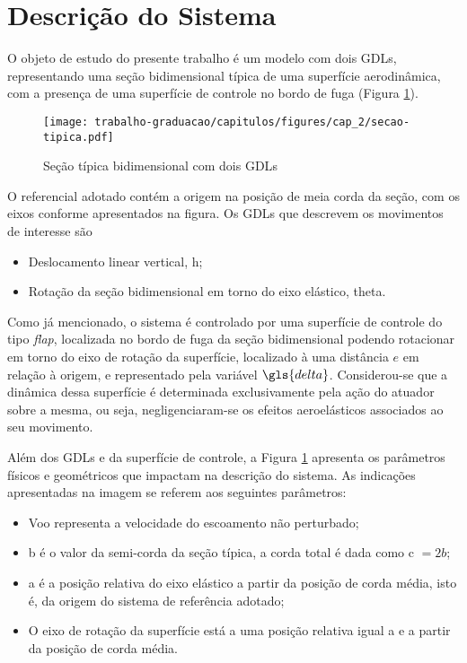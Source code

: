 
\section{Descrição do Sistema}\label{sec:descricao-sistema}

O objeto de estudo do presente trabalho é um modelo com dois \gls{GDL}s, representando uma seção bidimensional típica de uma superfície aerodinâmica, com a presença de uma superfície de controle no bordo de fuga (Figura \ref{fig:cap2:sistema-fisico}).

\begin{figure}[ht]
    \centering
    \caption{Seção típica bidimensional com dois \gls{GDL}s}
    \noindent\texttt{[image: trabalho-graduacao/capitulos/figures/cap\_2/secao-tipica.pdf]}
    \label{fig:cap2:sistema-fisico}
\end{figure}

O referencial adotado contém a origem na posição de meia corda da seção, com os eixos conforme apresentados na figura. Os \gls{GDL}s que descrevem os movimentos de interesse são

\begin{itemize}
    \item Deslocamento linear vertical, \gls{h};
    \item Rotação da seção bidimensional em torno do eixo elástico, \gls{theta}.
\end{itemize}

Como já mencionado, o sistema é controlado por uma superfície de controle do tipo \textit{flap}, localizada no bordo de fuga da seção bidimensional podendo rotacionar em torno do eixo de rotação da superfície, localizado à uma distância $e$ em relação à origem, e representado pela variável $\gls{delta}$. Considerou-se que a dinâmica dessa superfície é determinada exclusivamente pela ação do atuador sobre a mesma, ou seja, negligenciaram-se os efeitos aeroelásticos associados ao seu movimento.

Além dos \gls{GDL}s e da superfície de controle, a Figura \ref{fig:cap2:sistema-fisico} apresenta os parâmetros físicos e geométricos que impactam na descrição do sistema. As indicações apresentadas na imagem se referem aos seguintes parâmetros:

\begin{itemize}
    \item \gls{Voo} representa a velocidade do escoamento não perturbado;
    \item \gls{b} é o valor da semi-corda da seção típica, a corda total é dada como \gls{c} $ = 2b$;
    \item \gls{a} é a posição relativa do eixo elástico a partir da posição de corda média, isto é, da origem do sistema de referência adotado;
    \item O eixo de rotação da superfície está a uma posição relativa igual a \gls{e} a partir da posição de corda média.
\end{itemize}


